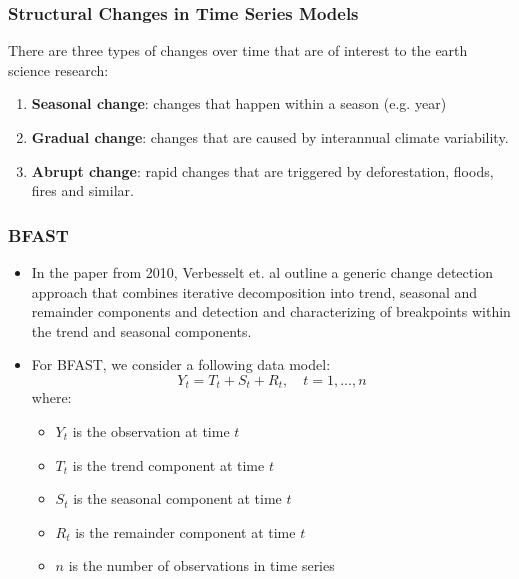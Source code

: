 \documentclass[presentation.tex]{subfiles}
\begin{document}
\begin{frame}
  \frametitle{Structural Changes in Time Series Models}
  There are three types of changes over time that are of
    interest to the earth science research:
    \begin{enumerate}
    \item \textbf{Seasonal change}: changes that happen within a season (e.g. year)
    \item \textbf{Gradual change}: changes that are caused by interannual climate
      variability.
    \item \textbf{Abrupt change}: rapid changes that are triggered by deforestation,
      floods, fires and similar.
    \end{enumerate}
\end{frame}

\begin{frame}
  \frametitle{BFAST}
  \begin{itemize}
    \item 
      In the paper from 2010, Verbesselt et. al outline a generic change detection approach
      that combines iterative decomposition into trend, seasonal and remainder components and detection
      and characterizing of breakpoints within the trend and seasonal components.
    \item 
      For BFAST, we consider a following data model:
      \[
      Y_t = T_t + S_t + R_t, \quad t = 1,...,n
      \]
      where:
      \begin{itemize}
      \item $Y_t$ is the observation at time $t$
      \item $T_t$ is the trend component at time $t$
      \item $S_t$ is the seasonal component at time $t$
      \item $R_t$ is the remainder component at time $t$
      \item $n$ is the number of observations in time series
      \end{itemize}
  \end{itemize}
\end{frame}
\end{document}
